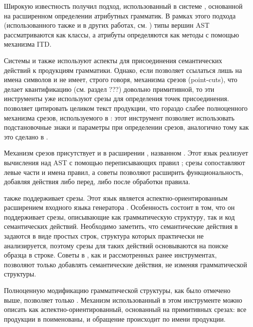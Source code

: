 Широкую известность получил подход, использованный в системе  \cite{JastAdd}, основанной на расширенном определении атрибутных грамматик. В рамках этого подхода (использованного также и в других работах, см. \cite{Silver}) типы вершин AST рассматриваются как классы, а атрибуты определяются как методы с помощью механизма ITD.

Системы  \cite{Silver} и  \cite{LISA} также используют аспекты для присоединения семантических действий к продукциям грамматики. Однако, если  позволяет ссылаться лишь на имена символов и не имеет, строго говоря, механизма срезов (point-cuts), что делает квантификацию (см. раздел ???) довольно примитивной, то эти инструменты уже используют срезы для определения точек присоединения.  позволяет цитировать целиком текст продукции, что гораздо слабее полноценного механизма срезов, используемого в : этот инструмент позволяет использовать подстановочные знаки и параметры при определении срезов, аналогично тому как это сделано в  \cite{AspectJ}.

Механизм срезов присутствует и в расширении , названном  \cite{AspectASF}. Этот язык реализует вычисления над AST с помощью переписывающих правил \cite{TermRewriting}; срезы сопоставляют левые части и имена правил, а советы позволяют расширить функциональность, добавляя действия либо перед, либо после обработки правила.

 \cite{AspectG} также поддерживает срезы. Этот язык является аспектно-ориентированным расширением входного языка генератора  \cite{ANTLR}. Особенность  состоит в том, что он поддерживает срезы, описывающие как грамматическую структуру, так и код семантических действий. Необходимо заметить, что семантические действия в  задаются в виде простых строк, структура которых практически не анализируется, поэтому срезы для таких действий основываются на поиске образца в строке. Советы в , как и рассмотренных ранее инструментах, позволяют только добавлять семантические действия, не изменяя грамматической структуры.

Полноценную модификацию грамматической структуры, как было отмечено выше, позволяет только . Механизм использованный в этом инструменте можно описать как аспектно-ориентированный, основанный на примитивных срезах: все продукции в  поименованы, и обращение происходит по имени продукции.

